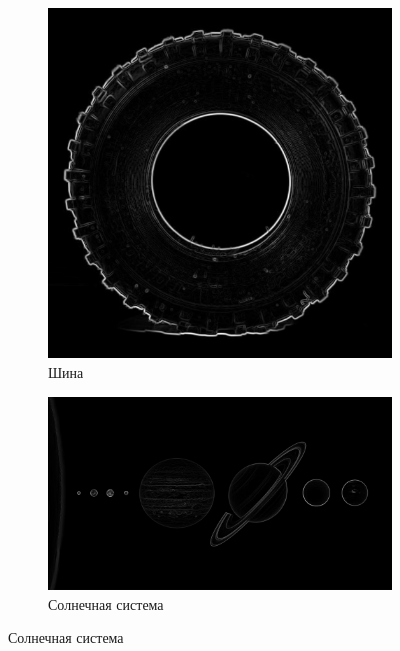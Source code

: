\documentclass[a4paper, 16pt]{article}
\begin{document}
    \newpage
    \begin{figure}[htbp]
        \centering
        \begin{subfigure}{0.3\textwidth}
            \centering
            \includegraphics[scale=0.15]{canny_ci1.png}
            \caption{Шина}
            \label{fig:canny_ci1}
        \end{subfigure}
        \hfill
        \begin{subfigure}{0.3\textwidth}
            \centering
            \includegraphics[width=\linewidth]{canny_ci2.png}
            \caption{Солнечная система}
            \label{fig:canny_ci2}
        \end{subfigure}

\end{figure}
\end{document}
